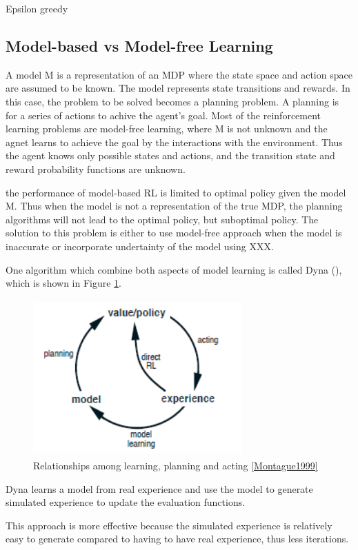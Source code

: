 \documentclass[12pt,twoside]{report}
\begin{document}
Epsilon greedy

\subsection{Model-based vs Model-free Learning}

A model M is a representation of an MDP where the state space and action space are assumed to be known. The model represents state transitions and rewards. In this case, the problem to be solved becomes a planning problem. A planning is for a series of actions to achive the agent's goal.
Most of the reinforcement learning problems are model-free learning, where M is not unknown and the agnet learns to achieve the goal by the interactions with the environment. Thus the agent knows only possible states and actions, and the transition state and reward probability functions are unknown.

the performance of model-based RL is limited to optimal policy given the model M. Thus when the model is not a representation of the true MDP, the planning algorithms will not lead to the optimal policy, but suboptimal policy. The solution to this problem is either to use model-free approach when the model is inaccurate or incorporate undertainty of the model using XXX.

One algorithm which combine both aspects of model learning is called Dyna (\cite{Sutton1990}), which is shown in Figure \ref{dyna}.

\begin{figure}[!htb]
\centering
\includegraphics[width=8cm, height=6cm]{./figures/dyna}
\caption{Relationships among learning, planning and acting \ref{Montague1999}}
\label{dyna}
\end{figure}

Dyna learns a model from real experience and use the model to generate simulated experience to update the evaluation functions.

This approach is more effective because the simulated experience is relatively easy to generate compared to having to have real experience, thus less iterations.
\end{document}
